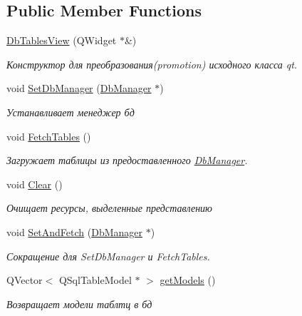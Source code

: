 \subsection*{Public Member Functions}
\begin{DoxyCompactItemize}
\item 
\hyperlink{class_db_tables_view_a822d3b44cd293111709021a5f6d6799d}{Db\+Tables\+View} (Q\+Widget $\ast$\&)
\begin{DoxyCompactList}\small\item\em Конструктор для преобразования(promotion) исходного класса qt. \end{DoxyCompactList}\item 
void \hyperlink{class_db_tables_view_a0affcc4de194a59eff1ddbb68b88413e}{Set\+Db\+Manager} (\hyperlink{class_db_manager}{Db\+Manager} $\ast$)
\begin{DoxyCompactList}\small\item\em Устанавливает менеджер бд \end{DoxyCompactList}\item 
\mbox{\label{class_db_tables_view_a85801e58584abc223bccc924ad707ead}} 
void \hyperlink{class_db_tables_view_a85801e58584abc223bccc924ad707ead}{Fetch\+Tables} ()
\begin{DoxyCompactList}\small\item\em Загружает таблицы из предоставленного \hyperlink{class_db_manager}{Db\+Manager}. \end{DoxyCompactList}\item 
\mbox{\label{class_db_tables_view_accf2ebff029e84812e48ca6564b392ef}} 
void \hyperlink{class_db_tables_view_accf2ebff029e84812e48ca6564b392ef}{Clear} ()
\begin{DoxyCompactList}\small\item\em Очищает ресурсы, выделенные представлению \end{DoxyCompactList}\item 
void \hyperlink{class_db_tables_view_ad3d7529bd0acc4d08fe0d60616e96599}{Set\+And\+Fetch} (\hyperlink{class_db_manager}{Db\+Manager} $\ast$)
\begin{DoxyCompactList}\small\item\em Сокращение для Set\+Db\+Manager и Fetch\+Tables. \end{DoxyCompactList}\item 
Q\+Vector$<$ Q\+Sql\+Table\+Model $\ast$ $>$ \hyperlink{class_db_tables_view_adfe2d826189cb96dba5e8c4908911141}{get\+Models} ()
\begin{DoxyCompactList}\small\item\em Возвращает модели таблтц в бд \end{DoxyCompactList}\end{DoxyCompactItemize}


